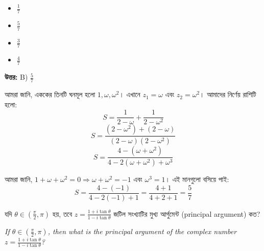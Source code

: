 \documentclass[12pt, a4paper]{article}
\begin{document}
\begin{itemize}[label={}, leftmargin=1cm, itemsep=0.5em]
    \item[\textbf{A)}] $\frac{1}{7}$
    \item[\textbf{B)}] $\frac{5}{7}$
    \item[\textbf{C)}] $\frac{3}{7}$
    \item[\textbf{D)}] $\frac{4}{7}$
\end{itemize}

\vspace{0.5em}
\begin{tcolorbox}[answerbox]
    \textbf{\color{success} উত্তর:} B) $\frac{5}{7}$
\end{tcolorbox}
\vspace{1em}

\begin{tcolorbox}[solutionbox={সমাধান (Solution)}]
    \noindent
    আমরা জানি, এককের তিনটি ঘনমূল হলো $1, \omega, \omega^2$। এখানে $z_1 = \omega$ এবং $z_2 = \omega^2$। আমাদের নির্ণেয় রাশিটি হলো:
    \[ S = \frac{1}{2 - \omega} + \frac{1}{2 - \omega^2} \]
    \[ S = \frac{(2 - \omega^2) + (2 - \omega)}{(2 - \omega)(2 - \omega^2)} \]
    \[ S = \frac{4 - (\omega + \omega^2)}{4 - 2(\omega + \omega^2) + \omega^3} \]
    
    \vspace{0.5em}
    আমরা জানি, $1 + \omega + \omega^2 = 0 \Rightarrow \omega + \omega^2 = -1$ এবং $\omega^3 = 1$। এই মানগুলো বসিয়ে পাই:
    \[ S = \frac{4 - (-1)}{4 - 2(-1) + 1} = \frac{4 + 1}{4 + 2 + 1} = \frac{5}{7} \]
\end{tcolorbox}
\vspace{1em}

\begin{tcolorbox}[questionbox={প্রশ্ন (Question) 21}]
    \noindent
    যদি $\theta \in \left(\frac{\pi}{2}, \pi\right)$ হয়, তবে $z = \frac{1 + i\tan\theta}{1 - i\tan\theta}$ জটিল সংখ্যাটির মুখ্য আর্গুমেন্ট (principal argument) কত?
    
    \vspace{0.8em}
    \begin{english}
    \noindent\textit{\color{darkgray}
    If $\theta \in \left(\frac{\pi}{2}, \pi\right)$, then what is the principal argument of the complex number $z = \frac{1 + i\tan\theta}{1 - i\tan\theta}$?
    }
    \end{english}
\end{tcolorbox}
\end{document}

